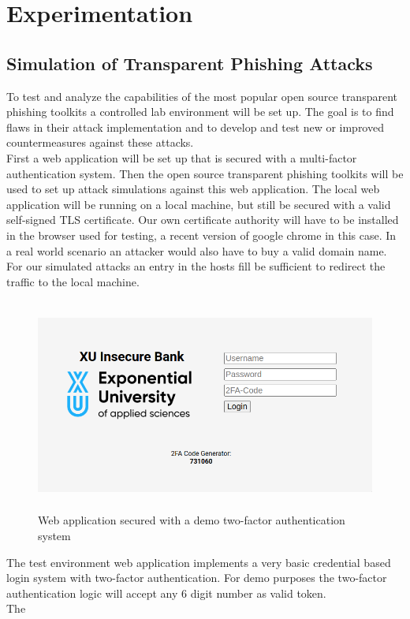 \documentclass[12pt]{scrbook}
\begin{document}
\newpage \chapter{Experimentation} \section{Simulation of Transparent Phishing
Attacks} To test and analyze the capabilities of the most popular open source
transparent phishing toolkits a controlled lab environment will be set up. The
goal is to find flaws in their attack implementation and to develop and test new
or improved countermeasures against these attacks.\\ First a web application
will be set up that is secured with a multi-factor authentication system. Then
the open source transparent phishing toolkits will be used to set up attack
simulations against this web application. The local web application will be
running on a local machine, but still be secured with a valid self-signed TLS
certificate. Our own certificate authority will have to be installed in the
browser used for testing, a recent version of google chrome in this case. In a
real world scenario an attacker would also have to buy a valid domain name. For
our simulated attacks an entry in the hosts fill be sufficient to redirect the
traffic to the local machine.\\ \begin{figure}[!htb] \centering
  \includegraphics[height=7cm]{./images/2fa_app.png} \caption{Web application
secured with a demo two-factor authentication system} \end{figure} The test
environment web application implements a very basic credential based login
system with two-factor authentication. For demo purposes the two-factor
authentication logic will accept any 6 digit number as valid token.\\The
\end{document}
